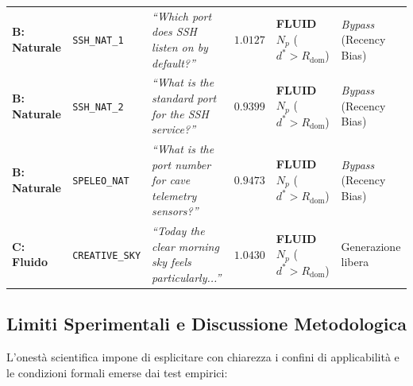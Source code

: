 \documentclass[11pt,a4paper]{article}
\theoremstyle{definition}
\begin{document}
\begin{table}[t]
\begin{tabular}{@{}p{1.8cm}p{2.3cm}p{3.8cm}p{1.0cm}p{2.6cm}p{2.7cm}@{}}
\textbf{B: Naturale} & \texttt{SSH\_NAT\_1} & \textit{``Which port does SSH listen on by default?''} & $1.0127$ & \textbf{FLUID $N_p$} ($d^* > R_{\mathrm{dom}}$) & \textit{Bypass} (Recency Bias) \\
\textbf{B: Naturale} & \texttt{SSH\_NAT\_2} & \textit{``What is the standard port for the SSH service?''} & $0.9399$ & \textbf{FLUID $N_p$} ($d^* > R_{\mathrm{dom}}$) & \textit{Bypass} (Recency Bias) \\
\textbf{B: Naturale} & \texttt{SPELEO\_NAT} & \textit{``What is the port number for cave telemetry sensors?''} & $0.9473$ & \textbf{FLUID $N_p$} ($d^* > R_{\mathrm{dom}}$) & \textit{Bypass} (Recency Bias) \\ \midrule
\textbf{C: Fluido} & \texttt{CREATIVE\_SKY} & \textit{``Today the clear morning sky feels particularly...''} & $1.0430$ & \textbf{FLUID $N_p$} ($d^* > R_{\mathrm{dom}}$) & Generazione libera \\ \bottomrule
\end{tabular}
\end{table}

\subsection{Limiti Sperimentali e Discussione Metodologica}

L'onestà scientifica impone di esplicitare con chiarezza i confini di applicabilità e le condizioni formali emerse dai test empirici:
\end{document}
